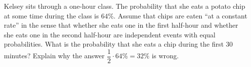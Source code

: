 Kelsey sits through a one-hour class. The probability that she eats a potato chip at some time during the class is $64\%$. Assume that chips are eaten ``at a constant rate'' in the sense that whether she eats one in the first half-hour and whether she eats one in the second half-hour are independent events with equal probabilities. What is the probability that she eats a chip during the first $30$ minutes? Explain why the answer $\dfrac12\cdot64\%=32\%$ is wrong.
